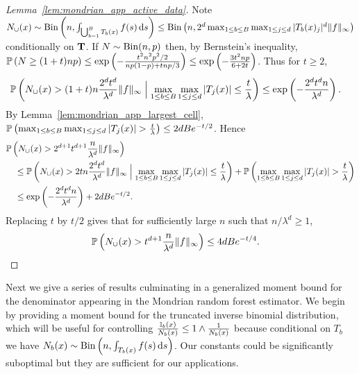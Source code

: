 \begin{proof}[Lemma~\ref{lem:mondrian_app_active_data}]

  Note
  $N_\cup(x) \sim
  \Bin\left(n, \int_{\bigcup_{b=1}^{B} T_b(x)} f(s) \diff s \right)
  \leq \Bin\left(n, 2^d \max_{1 \leq b \leq B} \max_{1 \leq j \leq d}
  |T_b(x)_j|^d \|f\|_\infty \right)$
  conditionally on $\bT$.
  If $N \sim \Bin(n,p)$ then, by Bernstein's inequality,
  $\P\left( N \geq (1 + t) n p\right)
  \leq \exp\left(-\frac{t^2 n^2 p^2 / 2}{n p(1-p) + t n p / 3}\right)
  \leq \exp\left(-\frac{3t^2 n p}{6 + 2t}\right)$.
  Thus for $t \geq 2$,
  \begin{align*}
    \P \left( N_{\cup}(x) > (1+t) n \frac{2^d t^d}{\lambda^d}
      \|f\|_\infty
      \Bigm| \max_{1 \leq b \leq B} \max_{1 \leq j \leq d}
      |T_j(x)| \leq \frac{t}{\lambda}
    \right)
    &\leq
    \exp\left(- \frac{2^d t^{d} n}{\lambda^d}\right).
  \end{align*}
  By Lemma~\ref{lem:mondrian_app_largest_cell},
  $\P \left( \max_{1 \leq b \leq B} \max_{1 \leq j \leq d}
  |T_j(x)| > \frac{t}{\lambda} \right)
  \leq 2 d B e^{-t/2}$.
  Hence
  \begin{align*}
    &\P \left( N_{\cup}(x) > 2^{d+1} t^{d+1} \frac{n}{\lambda^d}
      \|f\|_\infty
    \right) \\
    &\quad\leq
    \P \left( N_{\cup}(x) > 2 t n \frac{2^d t^d}{\lambda^d}
      \|f\|_\infty
      \Bigm| \max_{1 \leq b \leq B} \max_{1 \leq j \leq d}
      |T_j(x)| \leq \frac{t}{\lambda}
    \right)
    + \P \left( \max_{1 \leq b \leq B} \max_{1 \leq j \leq d}
      |T_j(x)| > \frac{t}{\lambda}
    \right) \\
    &\quad\leq
    \exp\left(- \frac{2^d t^{d} n}{\lambda^d}\right)
    + 2 d B e^{-t/2}.
  \end{align*}
  Replacing $t$ by $t/2$ gives that for sufficiently large $n$ such that
  $n / \lambda^d \geq 1$,
  \begin{align*}
    \P \left( N_{\cup}(x) > t^{d+1}
      \frac{n}{\lambda^d}
      \|f\|_\infty
    \right)
    &\leq
    4 d B e^{-t/4}.
  \end{align*}
\end{proof}

Next we give a series of results culminating in a
generalized moment bound for the denominator appearing
in the Mondrian random forest estimator.
We begin by providing a moment bound for the truncated inverse binomial
distribution, which will be useful for controlling
$\frac{\I_b(x)}{N_b(x)} \leq 1 \wedge \frac{1}{N_b(x)}$
because conditional on $T_b$ we have
$N_b(x) \sim \Bin \left( n, \int_{T_b(x)} f(s) \diff s \right)$.
Our constants could be significantly suboptimal but they are sufficient
for our applications.

